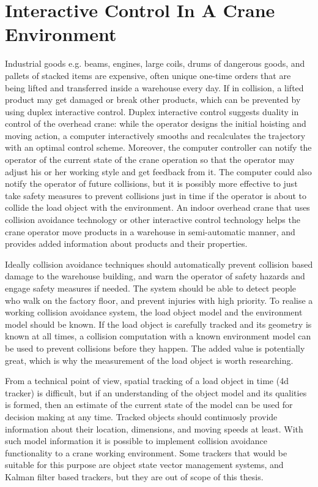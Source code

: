 \documentclass[12pt,a4paper,oneside,pdftex]{report}
\begin{document}
\section{Interactive Control In A Crane Environment}
\label{section:collision_control_in_a_crane_environment}

Industrial goods e.g. beams, engines, large coils, drums of dangerous goods, and pallets of stacked items are expensive, often unique one-time orders that are being lifted and transferred inside a warehouse every day. If in collision, a lifted product may get damaged or break other products, which can be prevented by using duplex interactive control. Duplex interactive control suggests duality in control of the overhead crane: while the operator designs the initial hoisting and moving action, a computer interactively smooths and recalculates the trajectory with an optimal control scheme. Moreover, the computer controller can notify the operator of the current state of the crane operation so that the operator may adjust his or her working style and get feedback from it. The computer could also notify the operator of future collisions, but it is possibly more effective to just take safety measures to prevent collisions just in time if the operator is about to collide the load object with the environment. An indoor overhead crane that uses collision avoidance technology or other interactive control technology helps the crane operator move products in a warehouse in semi-automatic manner, and provides added information about products and their properties.

Ideally collision avoidance techniques should automatically prevent collision based damage to the warehouse building, and warn the operator of safety hazards and engage safety measures if needed. The system should be able to detect people who walk on the factory floor, and prevent injuries with high priority.  To realise a working collision avoidance system, the load object model and the environment model should be known. If the load object is carefully tracked and its geometry is known at all times, a collision computation with a known environment model can be used to prevent collisions before they happen. The added value is potentially great, which is why the measurement of the load object is worth researching.

From a technical point of view, spatial tracking of a load object in time (4d tracker) is difficult, but if an understanding of the object model and its qualities is formed, then an estimate of the current state of the model can be used for decision making at any time. Tracked objects should continuosly provide information about their location, dimensions, and moving speeds at least. With such model information it is possible to implement collision avoidance functionality to a crane working environment. Some trackers that would be suitable for this purpose are object state vector management systems, and Kalman filter based trackers, but they are out of scope of this thesis. \citep{Leibe07} \citep{Corke11} \citep{Miller12}
\end{document}
